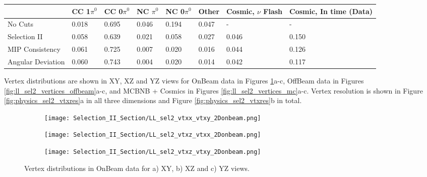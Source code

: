 \begin{table*}
\centering
{}
 \begin{tabular}{| l | l | l |l|l|l|l|l|}
 \hline
 & CC 1$\pi^0$ & CC 0$\pi^0$ & NC $\pi^0$ & NC 0$\pi^0$ & Other & Cosmic, $\nu$ Flash & Cosmic, In time (Data) \\ [0.1ex] \hline
No Cuts & 0.018 & 0.695 & 0.046 & 0.194 & 0.047 & - & -\\ 
Selection II & 0.058 & 0.639 & 0.021 & 0.058 & 0.027 & 0.046 & 0.150 \\ \hline
MIP Consistency & 0.061 & 0.725 & 0.007 & 0.020 & 0.016 & 0.044 & 0.126 \\ 
Angular Deviation & 0.060 & 0.743 & 0.004 & 0.020 & 0.014 & 0.042 & 0.117 \\ \hline
\end{tabular}
\end{table*}

Vertex distributions are shown in XY, XZ and YZ views for OnBeam data in Figures \ref{fig:ll_sel2_vertices_onbeam}a-c, OffBeam data in Figures \ref{fig:ll_sel2_vertices_offbeam}a-c, and MCBNB + Cosmics in Figures \ref{fig:ll_sel2_vertices_mc}a-c.  Vertex resolution is shown in Figure \ref{fig:physics_sel2_vtxres}a in all three dimensions and Figure \ref{fig:physics_sel2_vtxres}b in total. 

\begin{figure}[h!]
\centering
  \begin{subfigure}[t]{0.26\textwidth}
    \centering
\texttt{[image: Selection\_II\_Section/LL\_sel2\_vtxx\_vtxy\_2Donbeam.png]}
    \caption{ }
  \end{subfigure} 
  \hspace{10 mm}
  \begin{subfigure}[t]{0.26\textwidth}
    \centering
\texttt{[image: Selection\_II\_Section/LL\_sel2\_vtxz\_vtxx\_2Donbeam.png]}
    \caption{ }
  \end{subfigure} 
  \hspace{10 mm}
  \begin{subfigure}[t]{0.26\textwidth}
    \centering
\texttt{[image: Selection\_II\_Section/LL\_sel2\_vtxz\_vtxy\_2Donbeam.png]}
    \caption{ }
  \end{subfigure} 

\caption{ Vertex distributions in OnBeam data for a) XY, b) XZ and c) YZ views. }
\label{fig:ll_sel2_vertices_onbeam}
\end{figure}

